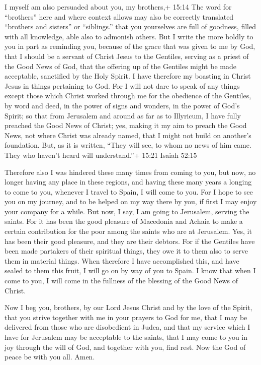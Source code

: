  I myself am also persuaded about you, my brothers,+ 15:14
The word for ``brothers'' here and where context allows may also be
correctly translated ``brothers and sisters'' or ``siblings.'' that you
yourselves are full of goodness, filled with all knowledge, able also to
admonish others.  But I write the more boldly to you in
part as reminding you, because of the grace that was given to me by God,
 that I should be a servant of Christ Jesus to the
Gentiles, serving as a priest of the Good News of God, that the offering
up of the Gentiles might be made acceptable, sanctified by the Holy
Spirit.  I have therefore my boasting in Christ Jesus in
things pertaining to God.  For I will not dare to speak of
any things except those which Christ worked through me for the obedience
of the Gentiles, by word and deed,  in the power of signs
and wonders, in the power of God's Spirit; so that from Jerusalem and
around as far as to Illyricum, I have fully preached the Good News of
Christ;  yes, making it my aim to preach the Good News, not
where Christ was already named, that I might not build on another's
foundation.  But, as it is written, ``They will see, to
whom no news of him came. They who haven't heard will understand.''+
15:21 Isaiah 52:15

 Therefore also I was hindered these many times from coming
to you,  but now, no longer having any place in these
regions, and having these many years a longing to come to you,
 whenever I travel to Spain, I will come to you. For I hope
to see you on my journey, and to be helped on my way there by you, if
first I may enjoy your company for a while.  But now, I
say, I am going to Jerusalem, serving the saints.  For it
has been the good pleasure of Macedonia and Achaia to make a certain
contribution for the poor among the saints who are at Jerusalem.
 Yes, it has been their good pleasure, and they are their
debtors. For if the Gentiles have been made partakers of their spiritual
things, they owe it to them also to serve them in material things.
 When therefore I have accomplished this, and have sealed
to them this fruit, I will go on by way of you to Spain.  I
know that when I come to you, I will come in the fullness of the
blessing of the Good News of Christ.

 Now I beg you, brothers, by our Lord Jesus Christ and by
the love of the Spirit, that you strive together with me in your prayers
to God for me,  that I may be delivered from those who are
disobedient in Judea, and that my service which I have for Jerusalem may
be acceptable to the saints,  that I may come to you in joy
through the will of God, and together with you, find rest. 
Now the God of peace be with you all. Amen.

